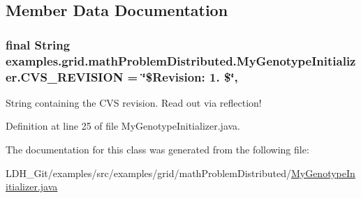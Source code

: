 \subsection{Member Data Documentation}
\hypertarget{classexamples_1_1grid_1_1math_problem_distributed_1_1_my_genotype_initializer_a09e36428050856032366e6b1efb2402d}{
\subsubsection[{C\-V\-S\-\_\-\-R\-E\-V\-I\-S\-I\-O\-N}]{\setlength{\rightskip}{0pt plus 5cm}final String examples.\-grid.\-math\-Problem\-Distributed.\-My\-Genotype\-Initializer.\-C\-V\-S\-\_\-\-R\-E\-V\-I\-S\-I\-O\-N = \char`\"{}\$Revision\-: 1. \$\char`\"{}\hspace{0.3cm}{\ttfamily [static]}, {\ttfamily [private]}}}\label{classexamples_1_1grid_1_1math_problem_distributed_1_1_my_genotype_initializer_a09e36428050856032366e6b1efb2402d}
String containing the C\-V\-S revision. Read out via reflection! 

Definition at line 25 of file My\-Genotype\-Initializer.\-java.



The documentation for this class was generated from the following file\-:\begin{DoxyCompactItemize}
\item 
L\-D\-H\-\_\-\-Git/examples/src/examples/grid/math\-Problem\-Distributed/\hyperlink{math_problem_distributed_2_my_genotype_initializer_8java}{My\-Genotype\-Initializer.\-java}\end{DoxyCompactItemize}
